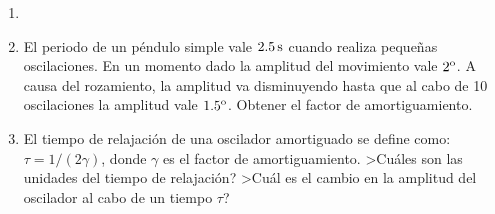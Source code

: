 \documentclass[12pt,twoside]{article}
\begin{document}
\begin{enumerate}
\item
{}

\newpage
\item
El periodo de un p\'{e}ndulo simple vale $2.5\,{\rm s}$ cuando realiza
peque\~{n}as oscilaciones. En un momento dado la amplitud del movimiento 
vale $2^{\rm o}$.  A causa del rozamiento,  la amplitud
va disminuyendo hasta que al cabo de 10 oscilaciones la amplitud vale
 $1.5^{\rm o}$. Obtener el factor de amortiguamiento.

\item
El tiempo de relajaci\'{o}n de una oscilador amortiguado se define como:
 $\tau=1/(2\gamma)$, donde $\gamma$ es el factor de amortiguamiento.
>Cuáles son las unidades del tiempo de relajaci\'{o}n? >Cu\'{a}l es el 
cambio en la amplitud del oscilador  al cabo de un tiempo $\tau$?


\end{enumerate}
\end{document}

